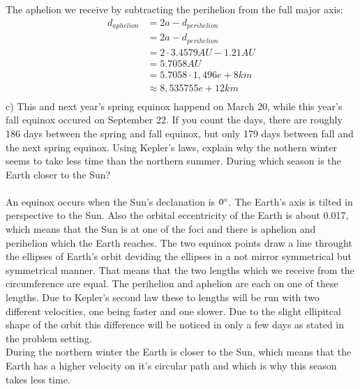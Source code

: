 The aphelion we receive by subtracting the perihelion from the full major axis:
\begin{equation*}
    \begin{split}
        d_{aphelion} &= 2a - d_{perihelion}\\
        &= 2a - d_{perihelion}\\
        &= 2 \cdot 3.4579 AU - 1.21 AU\\
        &= 5.7058 AU\\
        &= 5.7058 \cdot 1,496e+8 km\\
        &\approx 8,535755e+12 km\\
    \end{split}
\end{equation*}
c) This and next year's spring equinox happend on March 20, while this year's fall equinox occured on
September 22. If you count the days, there are roughly 186 days between the spring and fall equinox, but
only 179 days between fall and the next spring equinox. Using Kepler's laws, explain why the nothern 
winter seems to take less time than the northern summer. During which season is the Earth closer to the 
Sun?\\
\\
An equinox occurs when the Sun's declanation is $0 \degree$. The Earth's axis is tilted in perspective to
the Sun. Also the orbital eccentricity of the Earth is about 0.017, which means that the Sun is at one of
the foci and there is aphelion and perihelion which the Earth reaches. The two equinox points draw a line
throught the ellipses of Earth's orbit deviding the ellipses in a not mirror symmetrical but symmetrical
manner. That means that the two lengths which we receive from the circumference are equal. The perihelion
and aphelion are each on one of these lengths. Due to Kepler's second law these to lengths will be run
with two different velocities, one being faster and one slower. Due to the slight ellipitcal shape of the
orbit this difference will be noticed in only a few days as stated in the problem setting.\\
\noindent{}
\noindent
During the northern winter the Earth is closer to the Sun, which means that the Earth has a higher 
velocity on it's circular path and which is why this season takes less time.
